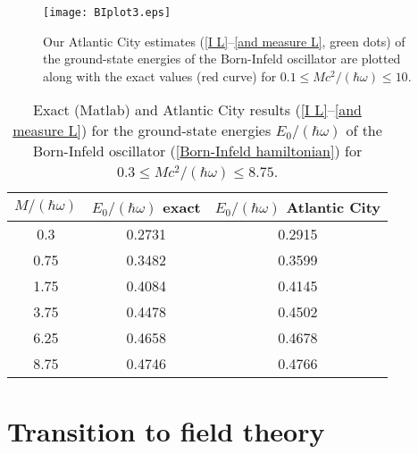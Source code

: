 \documentclass[prd,preprint,floatfix,showpacs]{revtex4-1}
\begin{document}
\begin{figure}[h]
\begin{center}
\texttt{[image: BIplot3.eps]}
\caption{Our Atlantic City  estimates 
(\ref{I L}--\ref{and measure L}, green dots)
of the ground-state energies of the 
Born-Infeld oscillator are plotted along 
with the exact values (red curve) for 
\( 0.1 \le Mc^2/(\hbar \omega) \le 10 \)\@.}
\label {very awkward Born-Infeld big masses}
\end{center}
\end{figure}

\par
\begin{table}[h]
\caption{Exact (Matlab) and 
Atlantic City  results 
(\ref {I L}--\ref{and measure L})
for the ground-state energies \( E_0/(\hbar \omega) \) 
of the Born-Infeld oscillator
(\ref{Born-Infeld hamiltonian})
for \( 0.3 \le Mc^2/(\hbar \omega) \le 8.75 \)\@.}
\begin{center}
\begin{tabular}{|c|c|c|}
\hline
\( M/(\hbar \omega) \)& \( E_0/(\hbar \omega) \) exact 
  & \(E_0/(\hbar \omega) \) Atlantic City   \\
\hline
0.3&0.2731&0.2915\\
\hline
0.75&0.3482&0.3599\\
\hline
1.75&0.4084&0.4145\\
\hline
3.75&0.4478&0.4502\\
\hline
6.25&0.4658&0.4678\\
\hline
8.75&0.4746&0.4766\\
\hline
\end{tabular}
\end{center}
\label {very awkward bigMasses}
\end{table}

\section{Transition to field theory
\label{Transition to field theory}}
\end{document}
